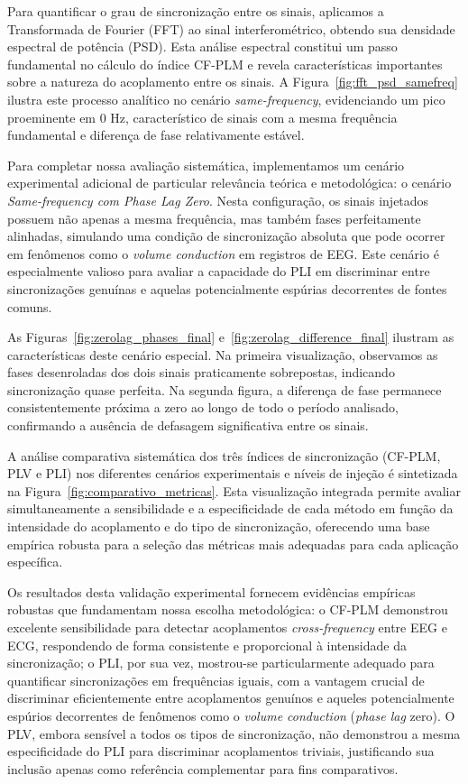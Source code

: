 Para quantificar o grau de sincronização entre os sinais, aplicamos a Transformada de Fourier (FFT) ao sinal interferométrico, obtendo sua densidade espectral de potência (PSD). Esta análise espectral constitui um passo fundamental no cálculo do índice CF-PLM e revela características importantes sobre a natureza do acoplamento entre os sinais. A Figura~\ref{fig:fft_psd_samefreq} ilustra este processo analítico no cenário \textit{same-frequency}, evidenciando um pico proeminente em 0 Hz, característico de sinais com a mesma frequência fundamental e diferença de fase relativamente estável.

Para completar nossa avaliação sistemática, implementamos um cenário experimental adicional de particular relevância teórica e metodológica: o cenário \textit{Same-frequency com Phase Lag Zero}. Nesta configuração, os sinais injetados possuem não apenas a mesma frequência, mas também fases perfeitamente alinhadas, simulando uma condição de sincronização absoluta que pode ocorrer em fenômenos como o \textit{volume conduction} em registros de EEG. Este cenário é especialmente valioso para avaliar a capacidade do PLI em discriminar entre sincronizações genuínas e aquelas potencialmente espúrias decorrentes de fontes comuns.

As Figuras~\ref{fig:zerolag_phases_final} e~\ref{fig:zerolag_difference_final} ilustram as características deste cenário especial. Na primeira visualização, observamos as fases desenroladas dos dois sinais praticamente sobrepostas, indicando sincronização quase perfeita. Na segunda figura, a diferença de fase permanece consistentemente próxima a zero ao longo de todo o período analisado, confirmando a ausência de defasagem significativa entre os sinais.

A análise comparativa sistemática dos três índices de sincronização (CF-PLM, PLV e PLI) nos diferentes cenários experimentais e níveis de injeção é sintetizada na Figura~\ref{fig:comparativo_metricas}. Esta visualização integrada permite avaliar simultaneamente a sensibilidade e a especificidade de cada método em função da intensidade do acoplamento e do tipo de sincronização, oferecendo uma base empírica robusta para a seleção das métricas mais adequadas para cada aplicação específica.

Os resultados desta validação experimental fornecem evidências empíricas robustas que fundamentam nossa escolha metodológica: o CF-PLM demonstrou excelente sensibilidade para detectar acoplamentos \textit{cross-frequency} entre EEG e ECG, respondendo de forma consistente e proporcional à intensidade da sincronização; o PLI, por sua vez, mostrou-se particularmente adequado para quantificar sincronizações em frequências iguais, com a vantagem crucial de discriminar eficientemente entre acoplamentos genuínos e aqueles potencialmente espúrios decorrentes de fenômenos como o \textit{volume conduction} (\textit{phase lag} zero). O PLV, embora sensível a todos os tipos de sincronização, não demonstrou a mesma especificidade do PLI para discriminar acoplamentos triviais, justificando sua inclusão apenas como referência complementar para fins comparativos.


